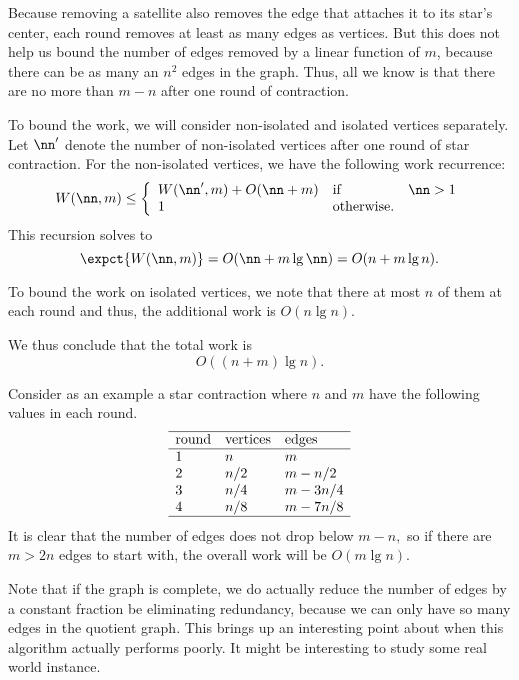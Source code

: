 \begin{group}
\begin{gram}
%
Because removing a satellite also removes the edge that attaches it to
its star's center, each round  removes at least as many edges as vertices.  
%
But this does not help us bound
the number of edges removed by a linear function of $m$, because there
can be as many an $n^2$ edges in the graph.
%
Thus, all we know is that there are no more than $m-n$ after one
round of contraction.

To bound the work, we will consider non-isolated and isolated vertices
separately.
%
Let $\nn'$  denote the  number of non-isolated vertices after one
round of star contraction.
%
For the non-isolated vertices, we have the following work recurrence:
\[
\begin{array}{lll}
W(\nn, m) 
\leq 
\left\{
\begin{array}{lll}
W(\nn', m) + O(\nn+m) & \mbox{if} & \nn > 1
\\
1 & \mbox{otherwise.}
\end{array}
\right.
\end{array}
\]
%
This recursion solves to
\[
\expct{W(\nn,m)} = O(\nn + m\lg \nn) = O(n + m \lg{n}).
\]

To bound the work on isolated vertices, we note that there at most $n$
of them at each round and thus, the additional work is $O(n \lg{n}).$

We thus conclude that the total work is
\[
O((n + m)\lg{n}).
\]
\end{gram}

\begin{note}
Consider as an example a star contraction where $n$ and $m$ have the
following values in each round.
\[
\begin{array}{lll}
\hline
 \mbox{round} & \mbox{vertices} & \mbox{edges}
\\
\hline
 1 & n & m 
\\
 2 & n/2 & m - n/2 
\\
 3 & n/4 & m - 3n/4 
\\
 4 & n/8 & m - 7n/8 
\\
\hline
 \end{array}
\]
It is clear that the number of edges does not drop below $m-n,$ so if
there are $m > 2n$ edges to start with, the overall work will be $O(m
\lg n)$.
%
\end{note}
\end{group}

\begin{teachnote}
Note that if the graph is complete, we do actually reduce the number
of edges by a constant fraction be eliminating redundancy, because we
can only have so many edges in the quotient graph. This brings up an
interesting point about when this algorithm actually performs poorly.
It might be interesting to study some real world instance.
\end{teachnote}

